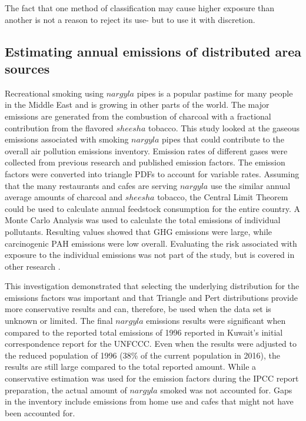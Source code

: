 The fact that one method of classification may cause higher exposure than another is not a reason to reject its use- but to use it with discretion. 

\subsection{Estimating annual emissions of distributed area sources}
Recreational smoking using $nargyla$ pipes is a popular pastime for many people in the Middle East and is growing in other parts of the world.  The major emissions are generated from the combustion of charcoal with a fractional contribution from the flavored $sheesha$ tobacco.  This study looked at the gaseous emissions associated with smoking $nargyla$ pipes that could contribute to the overall air pollution emissions inventory.  Emission rates of different gases were collected from previous research and published emission factors.  The emission factors were converted into triangle PDFs to account for variable rates.  Assuming that the many restaurants and cafes are serving $nargyla$ use the similar annual average amounts of charcoal and $sheesha$ tobacco, the Central Limit Theorem could be used to calculate annual feedstock consumption for the entire country.  A Monte Carlo Analysis was used to calculate the total emissions of individual pollutants.  Resulting values showed that GHG emissions were large, while carcinogenic PAH emissions were low overall.  Evaluating the risk associated with exposure to the individual emissions was not part of the study, but is covered in other research \citep{Fromme2009, Moon2015, Mulla2015}.

This investigation demonstrated that selecting the underlying distribution for the emissions factors was important and that Triangle and Pert distributions provide more conservative results and can, therefore, be used when the data set is unknown or limited.  The final $nargyla$ emissions results were significant when compared to the reported total emissions of 1996 reported in Kuwait’s initial correspondence report for the UNFCCC.  Even when the results were adjusted to the reduced population of 1996 (38\% of the current population in 2016), the results are still large compared to the total reported amount. While a conservative estimation was used for the emission factors during the IPCC report preparation, the actual amount of $nargyla$ smoked was not accounted for. Gaps in the inventory include emissions from home use and cafes that might not have been accounted for.

